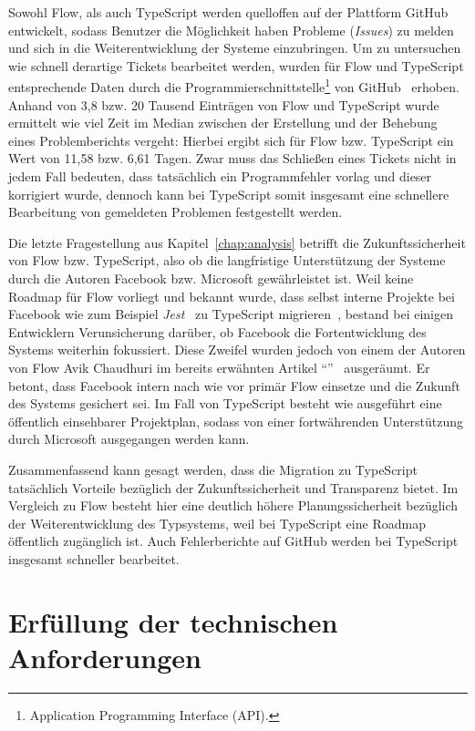 Sowohl Flow, als auch TypeScript werden quelloffen auf der Plattform GitHub entwickelt, sodass Benutzer die Möglichkeit haben Probleme (\textit{Issues}) zu melden und sich in die Weiterentwicklung der Systeme einzubringen. Um zu untersuchen wie schnell derartige Tickets bearbeitet werden, wurden für Flow und TypeScript entsprechende Daten durch die Programmierschnittstelle\footnote{Application Programming Interface (API).} von GitHub~\autocite{GITHUB:API} erhoben. Anhand von 3,8 bzw. 20 Tausend Einträgen von Flow und TypeScript wurde ermittelt wie viel Zeit im Median zwischen der Erstellung und der Behebung eines Problemberichts vergeht: Hierbei ergibt sich für Flow bzw. TypeScript ein Wert von 11,58 bzw. 6,61 Tagen. Zwar muss das Schließen eines Tickets nicht in jedem Fall bedeuten, dass tatsächlich ein Programmfehler vorlag und dieser korrigiert wurde, dennoch kann bei TypeScript somit insgesamt eine schnellere Bearbeitung von gemeldeten Problemen festgestellt werden.

Die letzte Fragestellung aus Kapitel~\ref{chap:analysis} betrifft die Zukunftssicherheit von Flow bzw. TypeScript, also ob die langfristige Unterstützung der Systeme durch die Autoren Facebook bzw. Microsoft gewährleistet ist. Weil keine Roadmap für Flow vorliegt und bekannt wurde, dass selbst interne Projekte bei Facebook wie zum Beispiel \textit{Jest}~\autocite{SOFTWARE:JEST} zu TypeScript migrieren~\autocite{JEST_TS}, bestand bei einigen Entwicklern Verunsicherung darüber, ob Facebook die Fortentwicklung des Systems weiterhin fokussiert. Diese Zweifel wurden jedoch von einem der Autoren von Flow Avik Chaudhuri im bereits erwähnten Artikel \enquote{}~\autocite{FLOW:UPDATE_2019} ausgeräumt. Er betont, dass Facebook intern nach wie vor primär Flow einsetze und die Zukunft des Systems gesichert sei. Im Fall von TypeScript besteht wie ausgeführt eine öffentlich einsehbarer Projektplan, sodass von einer fortwährenden Unterstützung durch Microsoft ausgegangen werden kann.

Zusammenfassend kann gesagt werden, dass die Migration zu TypeScript tatsächlich Vorteile bezüglich der Zukunftssicherheit und Transparenz bietet. Im Vergleich zu Flow besteht hier eine deutlich höhere Planungssicherheit bezüglich der Weiterentwicklung des Typsystems, weil bei TypeScript eine Roadmap öffentlich zugänglich ist. Auch Fehlerberichte auf GitHub werden bei TypeScript insgesamt schneller bearbeitet.

\section{Erfüllung der technischen Anforderungen}

